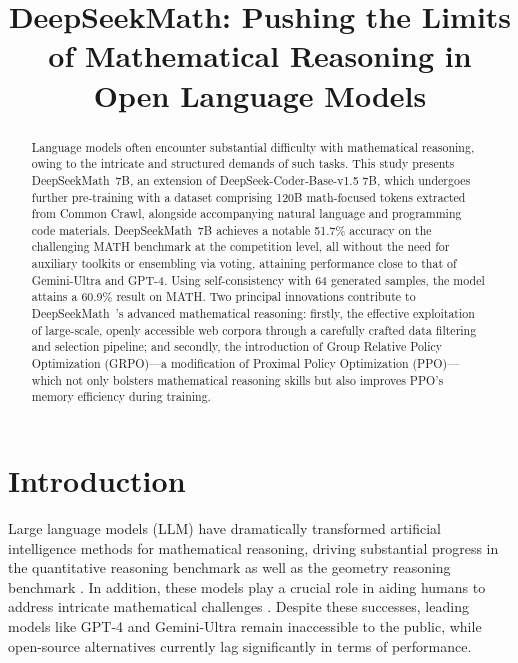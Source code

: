 \title{DeepSeekMath: Pushing the Limits of Mathematical Reasoning in Open Language Models}

\begin{abstract}
Language models often encounter substantial difficulty with mathematical reasoning, owing to the intricate and structured demands of such tasks. This study presents DeepSeekMath~7B, an extension of DeepSeek-Coder-Base-v1.5 7B, which undergoes further pre-training with a dataset comprising 120B math-focused tokens extracted from Common Crawl, alongside accompanying natural language and programming code materials. DeepSeekMath~7B achieves a notable 51.7\% accuracy on the challenging MATH benchmark at the competition level, all without the need for auxiliary toolkits or ensembling via voting, attaining performance close to that of Gemini-Ultra and GPT-4. Using self-consistency with 64 generated samples, the model attains a 60.9\% result on MATH. Two principal innovations contribute to DeepSeekMath~'s advanced mathematical reasoning: firstly, the effective exploitation of large-scale, openly accessible web corpora through a carefully crafted data filtering and selection pipeline; and secondly, the introduction of Group Relative Policy Optimization (GRPO)—a modification of Proximal Policy Optimization (PPO)—which not only bolsters mathematical reasoning skills but also improves PPO's memory efficiency during training.
\end{abstract}

\section{Introduction}

Large language models (LLM) have dramatically transformed artificial intelligence methods for mathematical reasoning, driving substantial progress in the quantitative reasoning benchmark \citep{MATH} as well as the geometry reasoning benchmark \citep{trinh2024solving}. In addition, these models play a crucial role in aiding humans to address intricate mathematical challenges \citep{tao}. Despite these successes, leading models like GPT-4 \citep{gpt4} and Gemini-Ultra \citep{gemini} remain inaccessible to the public, while open-source alternatives currently lag significantly in terms of performance.

